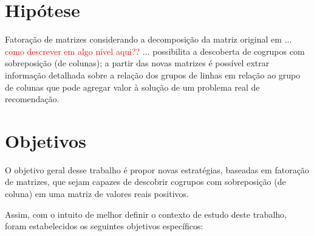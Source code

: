 \documentclass[
    12pt,                %
    oneside,            %
    a4paper,            %
    english,            %
    brazil                %
    ]{abntex2ppgsi}
\begin{document}


\section{Hipótese}

Fatoração de matrizes considerando a decomposição da matriz original em ... \textcolor{red}{como descrever em algo nível aqui??} ... possibilita a descoberta de cogrupos com sobreposição (de colunas); a partir das novas matrizes é possível extrar informação detalhada sobre a relação dos grupos de linhas em relação ao grupo de colunas que pode agregar valor à solução de um problema real de recomendação.



\section{Objetivos}

O objetivo geral desse trabalho é propor novas estratégias, baseadas em fatoração de matrizes, que sejam capazes de descobrir cogrupos com sobreposição (de coluna) em uma matriz de valores reais positivos.


Assim, com o intuito de melhor definir o contexto de estudo deste trabalho, foram estabelecidos os seguintes objetivos específicos:
\end{document}
